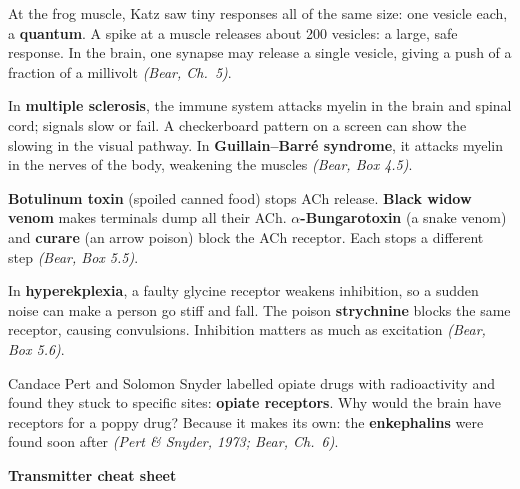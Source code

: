 \documentclass[12pt,a4paper]{article}
\newcommand{\pagehead}[1]{{\color{kprimary}\LARGE\bfseries #1}\par\vspace{2pt}{\color{kaccent}\rule{\linewidth}{1.2pt}}\par\vspace{4pt}}
\begin{document}
\begin{studycard}[title={Bernard Katz: transmitter comes in packets (1950s)}]
At the frog muscle, Katz saw tiny responses all of the same size: one vesicle each, a \textbf{quantum}. A spike at a muscle releases about 200 vesicles: a large, safe response. In the brain, one synapse may release a single vesicle, giving a push of a fraction of a millivolt \emph{(Bear, Ch.~5)}.
\end{studycard}

\begin{studycard}[title={Myelin in trouble: MS and Guillain--Barré}]
In \textbf{multiple sclerosis}, the immune system attacks myelin in the brain and spinal cord; signals slow or fail. A checkerboard pattern on a screen can show the slowing in the visual pathway. In \textbf{Guillain--Barré syndrome}, it attacks myelin in the nerves of the body, weakening the muscles \emph{(Bear, Box 4.5)}.
\end{studycard}

\begin{studycard}[title={Poisons that taught us the synapse}]
\textbf{Botulinum toxin} (spoiled canned food) stops ACh release. \textbf{Black widow venom} makes terminals dump all their ACh. \textbf{$\alpha$-Bungarotoxin} (a snake venom) and \textbf{curare} (an arrow poison) block the ACh receptor. Each stops a different step \emph{(Bear, Box 5.5)}.
\end{studycard}

\begin{studycard}[title={Startle disease and strychnine}]
In \textbf{hyperekplexia}, a faulty glycine receptor weakens inhibition, so a sudden noise can make a person go stiff and fall. The poison \textbf{strychnine} blocks the same receptor, causing convulsions. Inhibition matters as much as excitation \emph{(Bear, Box 5.6)}.
\end{studycard}

\begin{studycard}[title={Snyder and Pert: the brain's own morphine (1973)}]
Candace Pert and Solomon Snyder labelled opiate drugs with radioactivity and found they stuck to specific sites: \textbf{opiate receptors}. Why would the brain have receptors for a poppy drug? Because it makes its own: the \textbf{enkephalins} were found soon after \emph{(Pert \& Snyder, 1973; Bear, Ch.~6)}.
\end{studycard}
\normalsize

\newpage
\pagehead{Transmitter cheat sheet}
\end{document}
